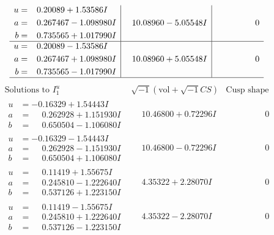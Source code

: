\documentclass[1p]{elsarticle_modified}
\theoremstyle{definition}
\newcommand{\I}{\sqrt{-1}}
\begin{document}
$$\begin{array}{c|c|c}
\begin{aligned}
u &= \phantom{-}0.20089 + 1.53586 I \\
a &= \phantom{-}0.267467 - 1.098980 I \\
b &= \phantom{-}0.735565 + 1.017990 I\end{aligned}
 & \phantom{-}10.08960 - 5.05548 I & \phantom{-0.000000 } 0 \\ \hline\begin{aligned}
u &= \phantom{-}0.20089 - 1.53586 I \\
a &= \phantom{-}0.267467 + 1.098980 I \\
b &= \phantom{-}0.735565 - 1.017990 I\end{aligned}
 & \phantom{-}10.08960 + 5.05548 I & \phantom{-0.000000 } 0\\
 \hline 
 \end{array}$$\newpage$$\begin{array}{c|c|c}  
\text{Solutions to }I^u_{1}& \I (\text{vol} + \sqrt{-1}CS) & \text{Cusp shape}\\
 \hline 
\begin{aligned}
u &= -0.16329 + 1.54443 I \\
a &= \phantom{-}0.262928 + 1.151930 I \\
b &= \phantom{-}0.650504 - 1.106080 I\end{aligned}
 & \phantom{-}10.46800 + 0.72296 I & \phantom{-0.000000 } 0 \\ \hline\begin{aligned}
u &= -0.16329 - 1.54443 I \\
a &= \phantom{-}0.262928 - 1.151930 I \\
b &= \phantom{-}0.650504 + 1.106080 I\end{aligned}
 & \phantom{-}10.46800 - 0.72296 I & \phantom{-0.000000 } 0 \\ \hline\begin{aligned}
u &= \phantom{-}0.11419 + 1.55675 I \\
a &= \phantom{-}0.245810 - 1.222640 I \\
b &= \phantom{-}0.537126 + 1.223150 I\end{aligned}
 & \phantom{-}4.35322 + 2.28070 I & \phantom{-0.000000 } 0 \\ \hline\begin{aligned}
u &= \phantom{-}0.11419 - 1.55675 I \\
a &= \phantom{-}0.245810 + 1.222640 I \\
b &= \phantom{-}0.537126 - 1.223150 I\end{aligned}
 & \phantom{-}4.35322 - 2.28070 I & \phantom{-0.000000 } 0 \\ \hline\begin{aligned}

\end{aligned}
\end{array}$$
\end{document}

